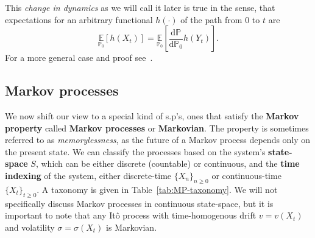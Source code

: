 This \emph{change in dynamics} as we will call it later is true in the sense, that expectations for an arbitrary functional $h(\cdot)$ of the path from $0$ to $t$ are
\begin{equation}
	\label{eq:girsanov_consequence}
	\underset{\mathbb{P}_0}{\mathbb{E}}\left[h(X_t)\right] = \underset{\mathbb{P}_0}{\mathbb{E}}\left[\frac{\mathrm{d} \mathbb{P}}{\mathrm{d} \mathbb{P}_0} h(Y_t)\right]. 
\end{equation}
For a more general case and proof see~\cite{sarkka2019applied}.

\subsection{Markov processes}
We now shift our view to a special kind of s.p's, ones that satisfy the \textbf{Markov property} called \textbf{Markov processes} or \textbf{Markovian}. The property is sometimes referred to as \emph{memorylessness}, as the future of a Markov process depends only on the present state. We can classify the processes based on the system's \textbf{state-space} $S$, which can be either discrete (countable) or continuous, and the \textbf{time indexing} of the system, either discrete-time $\{X_n\}_{n \geq 0}$ or continuous-time $\{X_t\}_{t \geq 0}$. A taxonomy is given in Table~\ref{tab:MP-taxonomy}. We will not specifically discuss Markov processes in continuous state-space, but it is important to note that any It\^ o process with time-homogenous drift $v = v(X_t)$ and volatility $\sigma = \sigma(X_t)$ is Markovian.

